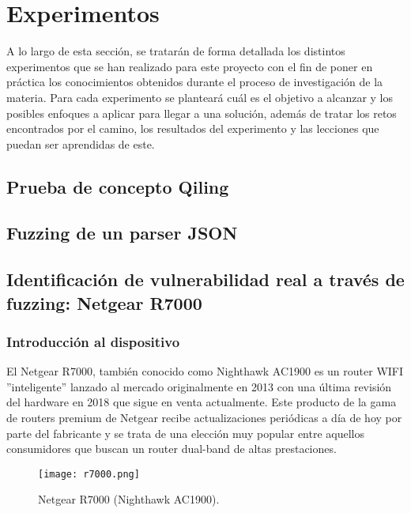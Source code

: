 \chapter{Experimentos}
\label{experimentos}
A lo largo de esta sección, se tratarán de forma detallada los distintos experimentos que se han realizado para este proyecto con el fin de 
poner en práctica los conocimientos obtenidos durante el proceso de investigación de la materia. Para cada experimento se planteará cuál es el 
objetivo a alcanzar y los posibles enfoques a aplicar para llegar a una solución, además de tratar los retos encontrados por el camino, los 
resultados del experimento y las lecciones que puedan ser aprendidas de este.

\section{Prueba de concepto Qiling}
\section{Fuzzing de un parser JSON}
\section{Identificación de vulnerabilidad real a través de fuzzing: Netgear R7000}
\subsection{Introducción al dispositivo}
El Netgear R7000, también conocido como Nighthawk AC1900 es un router WIFI ''inteligente'' lanzado al mercado originalmente en 2013 con una última
revisión del hardware en 2018 que sigue en venta actualmente. Este producto de la gama de routers premium de Netgear recibe actualizaciones periódicas
a día de hoy por parte del fabricante y se trata de una elección muy popular entre aquellos consumidores que buscan un router dual-band de altas prestaciones. 
\begin{figure}[H]
    \centering
    \texttt{[image: r7000.png]}
    \caption{Netgear R7000 (Nighthawk AC1900).}
    \label{fig:r7000}
\end{figure}

